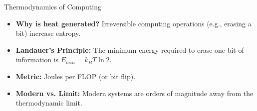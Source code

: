 \documentclass[aspectratio=169,10pt,xcolor={table,dvipsnames},t]{beamer}
\begin{document}
{%
\begin{frame}{Thermodynamics of Computing}
    \begin{itemize}
        \item \textbf{Why is heat generated?} Irreversible computing operations (e.g., erasing a bit) increase entropy.
        \item \textbf{Landauer's Principle:} The minimum energy required to erase one bit of information is $E_{min} = k_B T \ln 2$.
        \item \textbf{Metric:} Joules per FLOP (or bit flip).
        \item \textbf{Modern vs. Limit:} Modern systems are orders of magnitude away from the thermodynamic limit.
    \end{itemize}
\end{frame}


}
\end{document}
